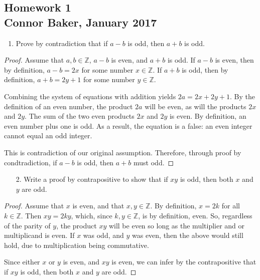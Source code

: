 \documentclass[10pt]{article}
\theoremstyle{definition}
\theoremstyle{plain}
\newcommand{\Z}{\mathbb{Z}}
\begin{document}
\begin{center}
\subsection*{Homework 1\\Connor Baker, January 2017}
\end{center}

\begin{enumerate}
\item Prove by contradiction that if $a-b$ is odd, then $a+b$ is odd.
\end{enumerate}

\begin{proof}
  Assume that $a,b\in\Z$, $a-b$ is even, and $a+b$ is odd. If $a-b$ is even, then by definition, $a-b=2x$ for some number $x\in\Z$. If $a+b$ is odd, then by definition, $a+b=2y+1$ for some number $y\in\Z$.

  \par Combining the system of equations with addition yields $2a=2x+2y+1$. By the definition of an even number, the product $2a$ will be even, as will the products $2x$ and $2y$. The sum of the two even products $2x$ and $2y$ is even. By definition, an even number plus one is odd. As a result, the equation is a false: an even integer cannot equal an odd integer.

  \par This is contradiction of our original assumption. Therefore, through proof by condtradiction, if $a-b$ is odd, then $a+b$ must odd.
\end{proof}

\begin{enumerate}
\item[2.] Write a proof by contrapositive to show that if $xy$ is odd, then both $x$ and $y$ are odd.
\end{enumerate}

\begin{proof}
  Assume that $x$ is even, and that $x,y\in\Z$. By definition, $x=2k$ for all $k\in\Z$. Then $xy=2ky$, which, since $k,y\in\Z$, is by definition, even. So, regardless of the parity of $y$, the product $xy$ will be even so long as the multiplier and or multiplicand is even. If $x$ was odd, and $y$ was even, then the above would still hold, due to multiplication being commutative.

  \par Since either $x$ or $y$ is even, and $xy$ is even, we can infer by the contrapositive that if $xy$ is odd, then both $x$ and $y$ are odd.
\end{proof}
\end{document}
